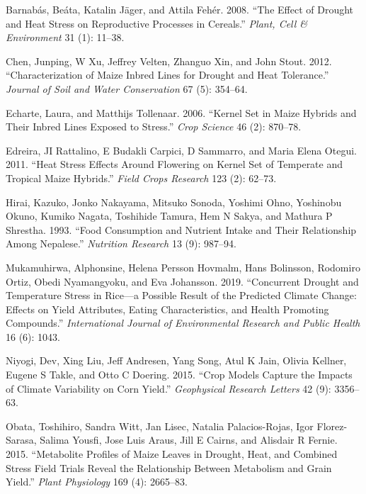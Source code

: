 \documentclass[
]{article}
\newlength{\cslhangindent}
\newenvironment{cslreferences}%
  {\setlength{\parindent}{0pt}%
  \everypar{\setlength{\hangindent}{\cslhangindent}}\ignorespaces}%
  {\par}
\begin{document}
\hypertarget{refs}{}
\begin{cslreferences}
\leavevmode\hypertarget{ref-barnabas2008effect}{}%
Barnabás, Beáta, Katalin Jäger, and Attila Fehér. 2008. ``The Effect of Drought and Heat Stress on Reproductive Processes in Cereals.'' \emph{Plant, Cell \& Environment} 31 (1): 11--38.

\leavevmode\hypertarget{ref-chen2012characterization}{}%
Chen, Junping, W Xu, Jeffrey Velten, Zhanguo Xin, and John Stout. 2012. ``Characterization of Maize Inbred Lines for Drought and Heat Tolerance.'' \emph{Journal of Soil and Water Conservation} 67 (5): 354--64.

\leavevmode\hypertarget{ref-echarte2006kernel}{}%
Echarte, Laura, and Matthijs Tollenaar. 2006. ``Kernel Set in Maize Hybrids and Their Inbred Lines Exposed to Stress.'' \emph{Crop Science} 46 (2): 870--78.

\leavevmode\hypertarget{ref-edreira2011heat}{}%
Edreira, JI Rattalino, E Budakli Carpici, D Sammarro, and Maria Elena Otegui. 2011. ``Heat Stress Effects Around Flowering on Kernel Set of Temperate and Tropical Maize Hybrids.'' \emph{Field Crops Research} 123 (2): 62--73.

\leavevmode\hypertarget{ref-hirai1993food}{}%
Hirai, Kazuko, Jonko Nakayama, Mitsuko Sonoda, Yoshimi Ohno, Yoshinobu Okuno, Kumiko Nagata, Toshihide Tamura, Hem N Sakya, and Mathura P Shrestha. 1993. ``Food Consumption and Nutrient Intake and Their Relationship Among Nepalese.'' \emph{Nutrition Research} 13 (9): 987--94.

\leavevmode\hypertarget{ref-mukamuhirwa2019concurrent}{}%
Mukamuhirwa, Alphonsine, Helena Persson Hovmalm, Hans Bolinsson, Rodomiro Ortiz, Obedi Nyamangyoku, and Eva Johansson. 2019. ``Concurrent Drought and Temperature Stress in Rice---a Possible Result of the Predicted Climate Change: Effects on Yield Attributes, Eating Characteristics, and Health Promoting Compounds.'' \emph{International Journal of Environmental Research and Public Health} 16 (6): 1043.

\leavevmode\hypertarget{ref-niyogi2015crop}{}%
Niyogi, Dev, Xing Liu, Jeff Andresen, Yang Song, Atul K Jain, Olivia Kellner, Eugene S Takle, and Otto C Doering. 2015. ``Crop Models Capture the Impacts of Climate Variability on Corn Yield.'' \emph{Geophysical Research Letters} 42 (9): 3356--63.

\leavevmode\hypertarget{ref-obata2015metabolite}{}%
Obata, Toshihiro, Sandra Witt, Jan Lisec, Natalia Palacios-Rojas, Igor Florez-Sarasa, Salima Yousfi, Jose Luis Araus, Jill E Cairns, and Alisdair R Fernie. 2015. ``Metabolite Profiles of Maize Leaves in Drought, Heat, and Combined Stress Field Trials Reveal the Relationship Between Metabolism and Grain Yield.'' \emph{Plant Physiology} 169 (4): 2665--83.


\end{cslreferences}
\end{document}
